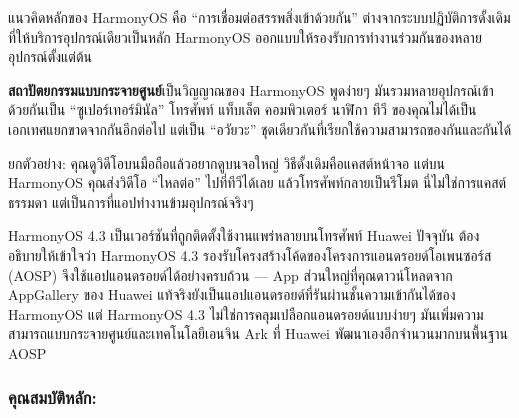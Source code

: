 


แนวคิดหลักของ HarmonyOS คือ “การเชื่อมต่อสรรพสิ่งเข้าด้วยกัน” ต่างจากระบบปฏิบัติการดั้งเดิมที่ให้บริการอุปกรณ์เดียวเป็นหลัก HarmonyOS ออกแบบให้รองรับการทำงานร่วมกันของหลายอุปกรณ์ตั้งแต่ต้น

\textbf{สถาปัตยกรรมแบบกระจายศูนย์}เป็นวิญญาณของ HarmonyOS พูดง่ายๆ มันรวมหลายอุปกรณ์เข้าด้วยกันเป็น “ซูเปอร์เทอร์มินัล” โทรศัพท์ แท็บเล็ต คอมพิวเตอร์ นาฬิกา ทีวี ของคุณไม่ได้เป็นเอกเทศแยกขาดจากกันอีกต่อไป แต่เป็น “อวัยวะ” ชุดเดียวกันที่เรียกใช้ความสามารถของกันและกันได้

ยกตัวอย่าง: คุณดูวิดีโอบนมือถือแล้วอยากดูบนจอใหญ่ วิธีดั้งเดิมคือแคสต์หน้าจอ แต่บน HarmonyOS คุณส่งวิดีโอ “ไหลต่อ” ไปที่ทีวีได้เลย แล้วโทรศัพท์กลายเป็นรีโมต นี่ไม่ใช่การแคสต์ธรรมดา แต่เป็นการที่แอปทำงานข้ามอุปกรณ์จริงๆ


HarmonyOS 4.3 เป็นเวอร์ชันที่ถูกติดตั้งใช้งานแพร่หลายบนโทรศัพท์ Huawei ปัจจุบัน ต้องอธิบายให้เข้าใจว่า HarmonyOS 4.3 รองรับโครงสร้างโค้ดของโครงการแอนดรอยด์โอเพนซอร์ส (AOSP) จึงใช้แอปแอนดรอยด์ได้อย่างครบถ้วน — App ส่วนใหญ่ที่คุณดาวน์โหลดจาก AppGallery ของ Huawei แท้จริงยังเป็นแอปแอนดรอยด์ที่รันผ่านชั้นความเข้ากันได้ของ HarmonyOS แต่ HarmonyOS 4.3 ไม่ใช่การคลุมเปลือกแอนดรอยด์แบบง่ายๆ มันเพิ่มความสามารถแบบกระจายศูนย์และเทคโนโลยีเอนจิน Ark ที่ Huawei พัฒนาเองอีกจำนวนมากบนพื้นฐาน AOSP

\subsubsection*{คุณสมบัติหลัก:}

